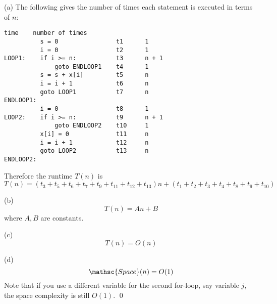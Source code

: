 (a) The following gives the number of times each statement is executed
in terms of $n$:
\begin{Verbatim}[frame=single, fontsize=\small]
                               time    number of times 
          s = 0                t1      1
          i = 0                t2      1
LOOP1:    if i >= n:           t3      n + 1
              goto ENDLOOP1    t4      1
          s = s + x[i]         t5      n
          i = i + 1            t6      n
          goto LOOP1           t7      n
ENDLOOP1:
          i = 0                t8      1
LOOP2:    if i >= n:           t9      n + 1
              goto ENDLOOP2    t10     1
          x[i] = 0             t11     n
          i = i + 1            t12     n
          goto LOOP2           t13     n
ENDLOOP2:
\end{Verbatim}
Therefore the runtime $T(n)$ is
\[
T(n) = (t_3 + t_5 + t_6 + t_7 + t_9 + t_{11} + t_{12} + t_{13})n + (t_1 + t_2 + t_3 + t_4 + t_8 + t_9 + t_{10})
\]

(b)
\[
T(n) = An + B
\]
where $A, B$ are constants.

(c)
\[
T(n) = O(n)
\]

(d)
\[
\mathsc{Space}(n) = O(1)
\]
Note that if you use a different variable for the second for-loop,
say variable $j$, the space complexity is still $O(1)$.
\qed
